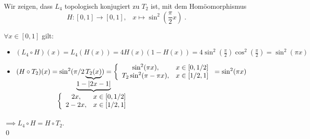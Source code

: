 \documentclass[a4paper]{article}
\begin{document}
\begin{Beweis}
\begin{minipage}{0.55\textwidth}
Wir zeigen, dass $L_4$ topologisch konjugiert zu $T_2$ ist, mit dem Homöomorphismus
\[H\colon [0,1]\to[0,1],\;\;\; x\mapsto \sin^2\left(\frac{\pi}{2}x\right)\;.\]
\end{minipage}
\hskip 10pt
\begin{minipage}{0.4\textwidth}
\end{minipage}

$\forall x\in[0,1]$ gilt:
\begin{itemize}
\item $(L_4\circ H)(x)=L_4(H(x))=4H(x)(1-H(x))=4\sin^2(\frac{\pi}{2})\cos^2(\frac{\pi}{2})=\sin^2(\pi x)$
\item $(H\circ T_2)(x)
=\sin^2(\pi/2\underbrace{T_2(x)}_{
\mathclap{\underbrace{1-|2x-1|}_{\left\{\begin{array}{cc}
2x,&x\in[0,1/2]\\
2-2x,& x\in[1/2,1]
\end{array}\right.}}})
=\left\{\begin{array}{cc}
\sin^2(\pi x),& x\in[0,1/2]\\
 T_2\sin^2(\pi-\pi x),& x\in[1/2,1]
\end{array}\right.=\sin^2(\pi x)$
\end{itemize}
$\implies L_4\circ H=H\circ T_2$.\\\qed
\end{Beweis}



\newpage
\renewcommand{\indexname}{Stichwortverzeichnis}

\printindex
\end{document}
